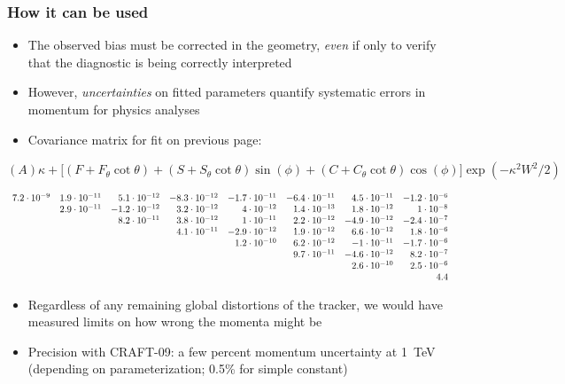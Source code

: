 \documentclass[compress]{beamer}
\begin{document}
\begin{frame}
\frametitle{How it can be used}

\begin{itemize}
\item The observed bias must be corrected in the geometry, {\it even} if
  only to verify that the diagnostic is being correctly interpreted

\item However, {\it uncertainties} on fitted parameters quantify systematic
  errors in momentum for physics analyses

\item Covariance matrix for fit on previous page:

\end{itemize}

{\scriptsize
$(A)\kappa + \big[(F + F_{\theta}\cot\theta) + (S + S_{\theta}\cot\theta)\sin(\phi) + (C + C_{\theta}\cot\theta)\cos(\phi)\big]\exp(-\kappa^2 W^2 / 2)$}

\vspace{0.2 cm}
{\mbox{\hspace{-1 cm}}\begin{minipage}{1.2\linewidth}
\tiny $\begin{array}{r r r r r r r r}
7.2\cdot 10^{-9} &  1.9\cdot 10^{-11} &  5.1\cdot 10^{-12} &  -8.3\cdot 10^{-12} &  -1.7\cdot 10^{-11} &  -6.4\cdot 10^{-11} &  4.5\cdot 10^{-11} &  -1.2\cdot 10^{-6} \\
&  2.9\cdot 10^{-11} &  -1.2\cdot 10^{-12} &  3.2\cdot 10^{-12} &  4\cdot 10^{-12} &  1.4\cdot 10^{-13} &  1.8\cdot 10^{-12} &  1\cdot 10^{-8} \\
&  &  8.2\cdot 10^{-11} &  3.8\cdot 10^{-12} &  1\cdot 10^{-11} &  2.2\cdot 10^{-12} &  -4.9\cdot 10^{-12} &  -2.4\cdot 10^{-7} \\
&  &  &  4.1\cdot 10^{-11} &  -2.9\cdot 10^{-12} &  1.9\cdot 10^{-12} &  6.6\cdot 10^{-12} &  1.8\cdot 10^{-6} \\
&  &  &  &  1.2\cdot 10^{-10} &  6.2\cdot 10^{-12} &  -1\cdot 10^{-11} &  -1.7\cdot 10^{-6} \\
&  &  &  &  &  9.7\cdot 10^{-11} &  -4.6\cdot 10^{-12} &  8.2\cdot 10^{-7} \\
&  &  &  &  &  &  2.6\cdot 10^{-10} &  2.5\cdot 10^{-6} \\
&  &  &  &  &  &  &  4.4 \\
\end{array}$
\end{minipage}}

\begin{itemize}

\item Regardless of any remaining global distortions of the tracker,
  we would have measured limits on how wrong the momenta might be

\item Precision with CRAFT-09: a few percent momentum uncertainty at
  1~TeV (depending on parameterization; 0.5\% for simple constant)
\end{itemize}
\end{frame}
\end{document}
